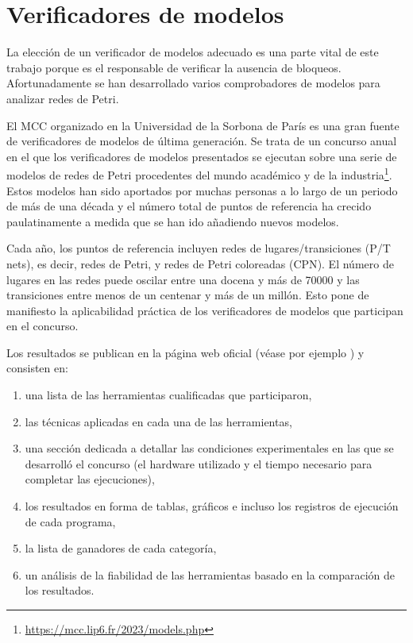 \section{Verificadores de modelos}

La elección de un verificador de modelos adecuado es una parte vital de este trabajo porque es
el responsable de verificar la ausencia de bloqueos. Afortunadamente se han desarrollado
varios comprobadores de modelos para analizar redes de Petri.

El \acrfull{MCC} \cite{khhjp2021} organizado en la
Universidad de la Sorbona de París es una gran fuente de verificadores de modelos de última
generación. Se trata de un concurso anual en el que los verificadores de modelos presentados
se ejecutan sobre una serie de modelos de redes de Petri procedentes del mundo académico y de la
industria\footnote{\url{https://mcc.lip6.fr/2023/models.php}}.
Estos modelos han sido aportados por muchas personas a lo largo de un periodo de
más de una década y el número total de puntos de referencia ha crecido paulatinamente a
medida que se han ido añadiendo nuevos modelos.

Cada año, los puntos de referencia incluyen redes de lugares/transiciones (\acrfull{P/T nets}), es
decir, redes de Petri, y redes de Petri coloreadas (\acrfull{CPN}). El número de lugares en las redes
puede oscilar entre una docena y más de 70000 y las transiciones entre menos de un
centenar y más de un millón. Esto pone de manifiesto la aplicabilidad práctica de los
verificadores de modelos que participan en el concurso.

Los resultados se publican en la página web oficial (véase por ejemplo \cite{mcc:2022}) y
consisten en:

\begin{enumerate}
      \item una lista de las herramientas cualificadas que participaron,
      \item las técnicas aplicadas en cada una de las herramientas,
      \item una sección dedicada a detallar las condiciones experimentales en las que se desarrolló el
            concurso (el hardware utilizado y el tiempo necesario para completar las ejecuciones),
      \item los resultados en forma de tablas, gráficos e incluso los registros de ejecución de cada programa,
      \item la lista de ganadores de cada categoría,
      \item un análisis de la fiabilidad de las herramientas basado en la comparación de los resultados.
\end{enumerate}


